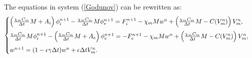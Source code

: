 \documentclass[a4paper,11pt]{article}
\begin{document}
The equations in system (\ref{Godunov}) can be rewritten as:
\begin{equation*}
\begin{cases}
\left( \frac{\chi_m C_m}{\Delta t} M + A_i \right ) \phi_i^{n+1} - \frac{\chi_m C_m}{\Delta t} M \phi_e^{n+1} = F_i^{n+1} - \chi_m M w^n + \left( \frac{\chi_m C_m}{\Delta t} M- C(V_m^n)\right) V_m^n,\vspace{2mm}\\
\frac{\chi_m C_m}{\Delta t} M  \phi_i^{n+1} - \left(\frac{\chi_m C_m}{\Delta t} M + A_e \right) \phi_e^{n+1} =  -F_e^{n+1} - \chi_m M w^n + \left( \frac{\chi_m C_m}{\Delta t} M- C(V_m^n)\right) V_m^n, \vspace{2mm}\\
w^{n+1} = (1-\epsilon \gamma \Delta t) w^n + \epsilon \Delta tV_m^n.
\end{cases}
\end{equation*}
\end{document}
